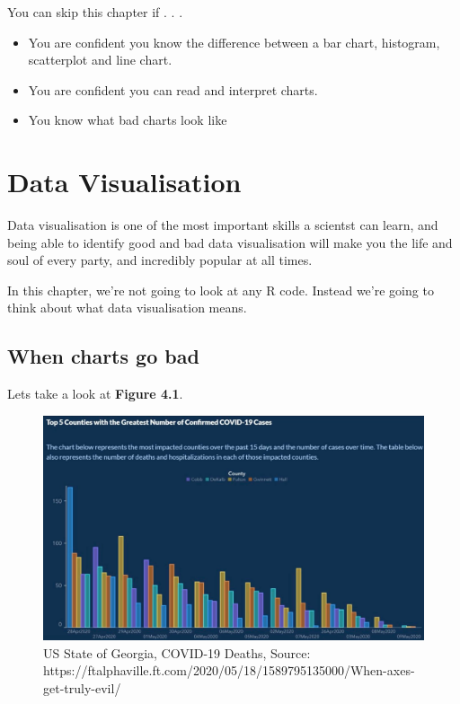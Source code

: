 \documentclass[
]{book}
\begin{document}
\begin{los}
You can skip this chapter if . . .

\begin{itemize}
\item
  You are confident you know the difference between a bar chart,
  histogram, scatterplot and line chart.
\item
  You are confident you can read and interpret charts.
\item
  You know what bad charts look like
\end{itemize}
\end{los}

\hypertarget{datavis}{%
\section{Data Visualisation}\label{datavis}}

Data visualisation is one of the most important skills a scientst can learn, and being able to identify good and bad data visualisation will make you the life and soul of every party, and incredibly popular at all times.

In this chapter, we're not going to look at any R code. Instead we're going to think about what data visualisation means.

\hypertarget{vis_bad}{%
\subsection{When charts go bad}\label{vis_bad}}

Lets take a look at \textbf{Figure 4.1}.

\begin{figure}

{\centering \includegraphics[width=25.42in]{images/04_datavis/georgia_covid} 

}

\caption{US State of Georgia, COVID-19 Deaths,
Source: https://ftalphaville.ft.com/2020/05/18/1589795135000/When-axes-get-truly-evil/}\label{fig:unnamed-chunk-64}
\end{figure}
\end{document}
